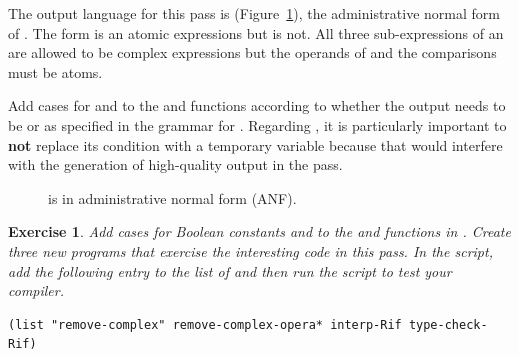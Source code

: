 \documentclass[11pt]{book}
\newcommand{\gray}[1]{{\color{gray} #1}}
\newtheorem{exercise}[theorem]{Exercise}
\begin{document}
The output language for this pass is \LangIfANF{}
(Figure~\ref{fig:Rif-anf-syntax}), the administrative normal form of
\LangIf{}.  The  form is an atomic expressions but
 is not.  All three sub-expressions of an  are
allowed to be complex expressions but the operands of  and
the comparisons must be atoms.

Add cases for  and  to the  and
 functions according to whether the output needs to be
\Exp{} or \Atm{} as specified in the grammar for \LangIfANF{}.
Regarding , it is particularly important to \textbf{not}
replace its condition with a temporary variable because that would
interfere with the generation of high-quality output in the
 pass.

\begin{figure}[tp]
\centering
\fbox{
\begin{minipage}{0.96\textwidth}
\[
\begin{array}{rcl}
\Atm &::=& \gray{ \INT{\Int} \mid \VAR{\Var} } \mid \BOOL{\itm{bool}}\\
\Exp &::=& \gray{ \Atm \mid \READ{} } \\
     &\mid& \gray{ \NEG{\Atm} \mid \ADD{\Atm}{\Atm} } \\
     &\mid& \gray{ \LET{\Var}{\Exp}{\Exp} } \\
     &\mid& \UNIOP{\key{not}}{\Atm} \\
      &\mid& \BINOP{\itm{cmp}}{\Atm}{\Atm} \mid \IF{\Exp}{\Exp}{\Exp} \\
R^{\dagger}_2  &::=& \PROGRAM{\code{()}}{\Exp}
\end{array}
\]
\end{minipage}
}
\caption{\LangIfANF{} is \LangIf{} in administrative normal form (ANF).}
\label{fig:Rif-anf-syntax}
\end{figure}


\begin{exercise}\normalfont
%
Add cases for Boolean constants and  to the 
and  functions in .
%
Create three new \LangInt{} programs that exercise the interesting
code in this pass.
%
In the  script, add the following entry to the
list of  and then run the script to test your compiler.
\begin{lstlisting}
(list "remove-complex" remove-complex-opera* interp-Rif type-check-Rif)
\end{lstlisting}
\end{exercise}
\end{document}
